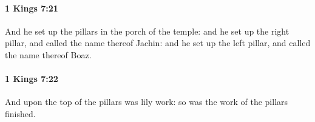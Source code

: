		\paragraph{1 Kings 7:21} %
			\label{1KINGS-7-21}

			And he set up the pillars in the porch of the temple: and he set up the right pillar, and called the name thereof Jachin: and he set up the left pillar, and called the name thereof Boaz.


		\paragraph{1 Kings 7:22} %
			\label{1KINGS-7-22}

			And upon the top of the pillars was lily work: so was the work of the pillars finished.


